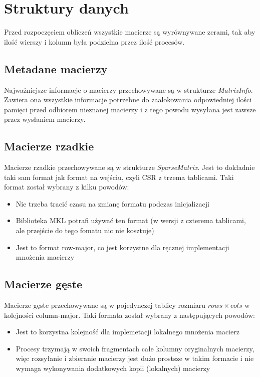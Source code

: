 \documentclass{article}
\begin{document}
\section{Struktury danych}

Przed rozpoczęciem obliczeń wszystkie macierze są wyrównywane zerami, tak aby ilość wierszy i kolumn była podzielna przez ilość procesów.

\subsection{Metadane macierzy}
Najważniejsze informacje o macierzy przechowywane są w strukturze \emph{MatrixInfo}. Zawiera ona wszystkie informacje potrzebne 
do zaalokowania odpowiedniej ilości pamięci przed odbiorem nieznanej macierzy i z tego powodu wysyłana jest zawsze przez wysłaniem 
macierzy.

\subsection{Macierze rzadkie}
Macierze rzadkie przechowywane są w strukturze \emph{SparseMatrix}. Jest to dokładnie taki sam format jak format na wejściu, 
czyli CSR z trzema tablicami.
Taki format został wybrany z kilku powodów:
\begin{itemize}
  \item Nie trzeba tracić czasu na zmianę formatu podczas inicjalizacji
  \item Biblioteka MKL potrafi używać ten format (w wersji z czterema tablicami, ale przejście do tego fomatu nic nie kosztuje)
  \item Jest to format row-major, co jest korzystne dla ręcznej implementacji mnożenia macierzy
\end{itemize}

\subsection{Macierze gęste}
Macierze gęste przechowywane są w pojedynczej tablicy rozmiaru $rows \times cols$ w kolejności column-major.
Taki formata został wybrany z następujących powodów:
\begin{itemize}
  \item Jest to korzystna kolejność dla implemetacji lokalnego mnożenia macierz
  \item Procesy trzymają w swoich fragmentach całe kolumny oryginalnych macierzy, więc rozsyłanie i zbieranie macierzy jest dużo prostsze
           w takim formacie i nie wymaga wykonywania dodatkowych kopii (lokalnych) macierzy
\end{itemize} 
\end{document}

